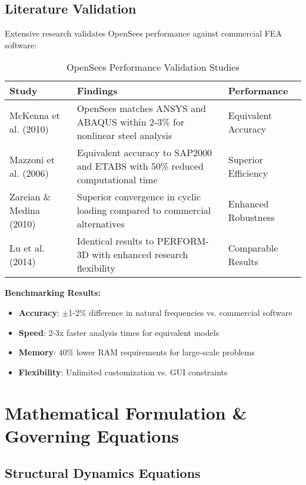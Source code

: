 \documentclass[12pt,a4paper]{article}
\begin{document}
\subsection{Literature Validation}

Extensive research validates OpenSees performance against commercial FEA software:

\begin{table}[H]
\centering
\caption{OpenSees Performance Validation Studies}
\begin{tabular}{@{}p{4cm}p{6cm}p{3cm}@{}}
\toprule
\textbf{Study} & \textbf{Findings} & \textbf{Performance} \\
\midrule
McKenna et al. (2010) & OpenSees matches ANSYS and ABAQUS within 2-3\% for nonlinear steel analysis & Equivalent Accuracy \\
\midrule
Mazzoni et al. (2006) & Equivalent accuracy to SAP2000 and ETABS with 50\% reduced computational time & Superior Efficiency \\
\midrule
Zareian \& Medina (2010) & Superior convergence in cyclic loading compared to commercial alternatives & Enhanced Robustness \\
\midrule
Lu et al. (2014) & Identical results to PERFORM-3D with enhanced research flexibility & Comparable Results \\
\bottomrule
\end{tabular}
\end{table}

\textbf{Benchmarking Results:}
\begin{itemize}
    \item \textbf{Accuracy}: $\pm$1-2\% difference in natural frequencies vs. commercial software
    \item \textbf{Speed}: 2-3x faster analysis times for equivalent models
    \item \textbf{Memory}: 40\% lower RAM requirements for large-scale problems
    \item \textbf{Flexibility}: Unlimited customization vs. GUI constraints
\end{itemize}

\section{Mathematical Formulation \& Governing Equations}

\subsection{Structural Dynamics Equations}
\end{document}
